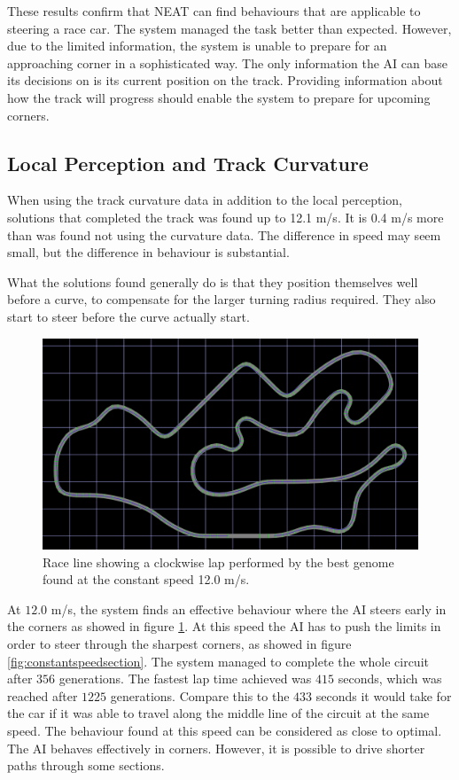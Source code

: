 \noindent
These results confirm that NEAT can find behaviours that are applicable to steering a race car. The system managed the task better than expected. However, due to the limited information, the system is unable to prepare for an approaching corner in a sophisticated way. The only information the AI can base its decisions on is its current position on the track. Providing information about how the track will progress should enable the system to prepare for upcoming corners. 


\subsection{Local Perception and Track Curvature}
\label{subsec:fixedspeedcurvature}

When using the track curvature data in addition to the local perception, solutions that completed the track was found up to 12.1 m/s. It is 0.4 m/s more than was found not using the curvature data. The difference in speed may seem small, but the difference in behaviour is substantial.

What the solutions found generally do is that they position themselves well before a curve, to compensate for the larger turning radius required. They also start to steer before the curve actually start.

\begin{figure}[H]
\includegraphics[width=\textwidth]{report/images/fixed_curve_data}
\centering
\caption{Race line showing a clockwise lap performed by the best genome found at the constant speed 12.0 m/s.}
\label{fig:constantspeedline}
\end{figure}

\noindent
At $12.0$ m/s, the system finds an effective behaviour where the AI steers early in the corners as showed in figure \ref{fig:constantspeedline}. At this speed the AI has to push the limits in order to steer through the sharpest corners, as showed in figure \ref{fig:constantspeedsection}. The system managed to complete the whole circuit after $356$ generations. The fastest lap time achieved was $415$ seconds, which was reached after $1225$ generations. Compare this to the $433$ seconds it would take for the car if it was able to travel along the middle line of the circuit at the same speed. The behaviour found at this speed can be considered as close to optimal. The AI behaves effectively in corners. However, it is possible to drive shorter paths through some sections.

